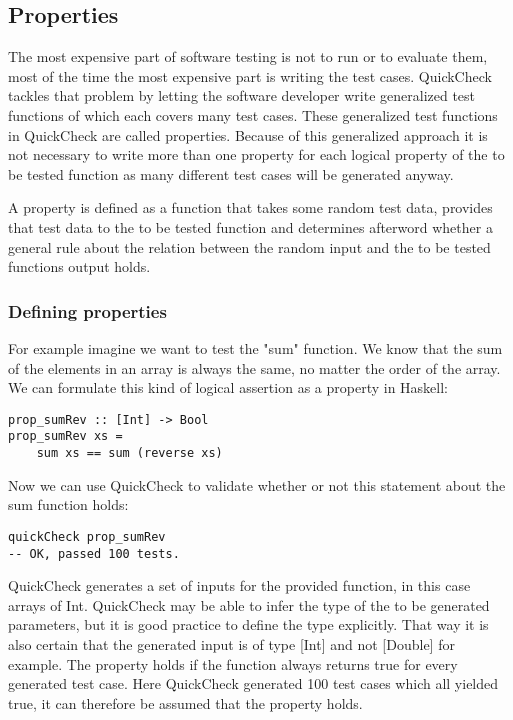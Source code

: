 \documentclass[a4paper, 12pt]{article} %
\begin{document}
\subsection{Properties}

The most expensive part of software testing is not to run or to evaluate them, most of the time the most expensive part is writing the test cases. QuickCheck tackles that problem by letting the software developer write generalized test functions of which each covers many test cases. These generalized test functions in QuickCheck are called properties. \cite{Hughes2010} Because of this generalized approach it is not necessary to write more than one property for each logical property of the to be tested function as many different test cases will be generated anyway. \cite{Hughes2006}

A property is defined as a function that takes some random test data, provides that test data to the to be tested function and determines afterword whether a general rule about the relation between the random input and the to be tested functions output holds.

\subsubsection{Defining properties}

For example imagine we want to test the "sum" function. We know that the sum of the elements in an array is always the same, no matter the order of the array. We can formulate this kind of logical assertion as a property in Haskell:

\begin{verbatim}
prop_sumRev :: [Int] -> Bool
prop_sumRev xs = 
    sum xs == sum (reverse xs)
\end{verbatim}

Now we can use QuickCheck to validate whether or not this statement about the sum function holds:

\begin{verbatim}
quickCheck prop_sumRev
-- OK, passed 100 tests.
\end{verbatim}

QuickCheck generates a set of inputs for the provided function, in this case arrays of Int. QuickCheck may be able to infer the type of the to be generated parameters, but it is good practice to define the type explicitly. That way it is also certain that the generated input is of type [Int] and not [Double] for example. The property holds if the function always returns true for every generated test case. \cite{Claessen2000} Here QuickCheck generated 100 test cases which all yielded true, it can therefore be assumed that the property holds.
\end{document}
